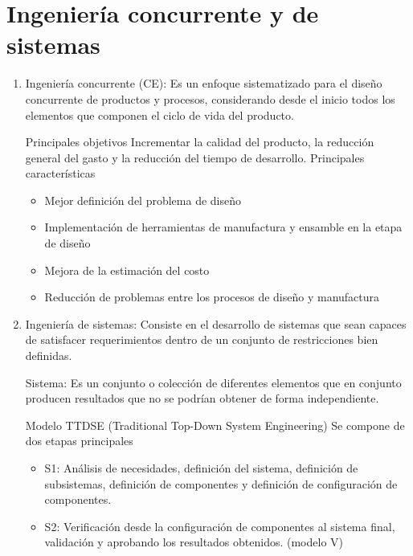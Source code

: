 \section{Ingeniería concurrente y de sistemas}
\begin{enumerate}
    \item Ingeniería concurrente (CE): Es un enfoque sistematizado para el diseño concurrente de productos y procesos, considerando desde el inicio todos los elementos que componen el ciclo de vida del producto. 

    Principales objetivos
    Incrementar la calidad del producto, la reducción general del gasto y la reducción del tiempo de desarrollo. 
    Principales características
    
    \begin{itemize}
        \item Mejor definición del problema de diseño 
        \item Implementación de herramientas de manufactura y ensamble en la etapa de diseño
        \item Mejora de la estimación del costo
        \item Reducción de problemas entre los procesos de diseño y manufactura
    \end{itemize}

    \item Ingeniería de sistemas: Consiste en el desarrollo de sistemas que sean capaces de satisfacer requerimientos dentro de un conjunto de restricciones bien definidas.
    
    Sistema: Es un conjunto o colección de diferentes elementos que en conjunto producen resultados que no se podrían obtener de forma independiente.

    Modelo TTDSE (Traditional Top-Down System Engineering) 
    Se compone de dos etapas principales
    
    \begin{itemize}
        \item S1: Análisis de necesidades, definición del sistema, definición de subsistemas, definición de componentes y definición de configuración de componentes.
        \item S2: Verificación desde la configuración de componentes al sistema final, validación y aprobando los resultados obtenidos. (modelo V)
    \end{itemize}
    

\end{enumerate}
